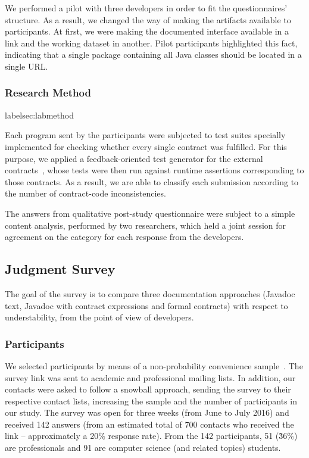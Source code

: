 We performed a pilot with three developers in order to fit the questionnaires' structure.
As a result, we changed the way of making the artifacts available to participants. 
At first, we were making the documented interface available in a link and the working dataset in another. 
Pilot participants highlighted this fact, indicating that a single package containing all Java classes should be located in a single URL.

\subsubsection{Research Method}
label{sec:labmethod}

Each program sent by the participants were subjected to test suites specially implemented for checking whether every single contract was fulfilled.
For this purpose, we applied a feedback-oriented test generator for the external contracts~\cite{sac2017}, whose tests were then run against runtime assertions corresponding to those contracts.
As a result, we are able to classify each submission according to the number of contract-code inconsistencies.

The answers from qualitative post-study questionnaire were subject to a simple content analysis, performed by two researchers, which held a joint session for agreement on the category for each response from the developers.


\subsection{Judgment Survey}
\label{sec:survey}

The goal of the survey is to compare three documentation approaches (Javadoc text, Javadoc with contract expressions and formal contracts) with respect to understability, from the point of view of developers. 

\subsubsection{Participants}
\label{sec:surveyPart}

We selected participants by means of a non-probability  convenience sample~\cite{wohlin}. 
The survey link was sent to academic and professional mailing lists.
In addition, our contacts were asked to follow a snowball approach, sending the survey to their respective
contact lists, increasing the sample and the number of participants in our study.
The survey was open for three weeks (from June to July 2016) and received 142
answers (from an estimated total of 700 contacts who received the link -- approximately a 20\% response
rate). From the 142 participants, 51 (\~36\%) are professionals and 91 are computer science (and related topics) students.


